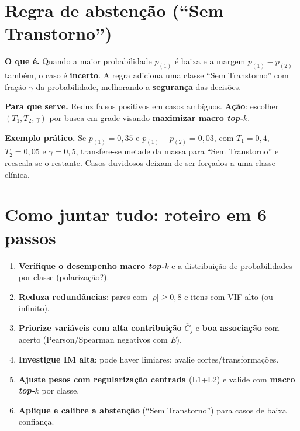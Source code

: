 \documentclass[12pt,a4paper]{article}
\begin{document}
\section{Regra de abstenção (``Sem Transtorno'')}
\textbf{O que é.} Quando a maior probabilidade $p_{(1)}$ é baixa e a margem $p_{(1)}-p_{(2)}$ também, o caso é \textbf{incerto}. A regra adiciona uma classe ``Sem Transtorno'' com fração $\gamma$ da probabilidade, melhorando a \textbf{segurança} das decisões.

\textbf{Para que serve.} Reduz falsos positivos em casos ambíguos. \textbf{Ação}: escolher $(T_1,T_2,\gamma)$ por busca em grade visando \textbf{maximizar macro \emph{top-$k$}}.

\textbf{Exemplo prático.} Se $p_{(1)}=0{,}35$ e $p_{(1)}-p_{(2)}=0{,}03$, com $T_1=0{,}4$, $T_2=0{,}05$ e $\gamma=0{,}5$, transfere-se metade da massa para ``Sem Transtorno'' e reescala-se o restante. Casos duvidosos deixam de ser forçados a uma classe clínica.

\section{Como juntar tudo: roteiro em 6 passos}
\begin{enumerate}[leftmargin=1.2cm]
  \item \textbf{Verifique o desempenho macro \emph{top-$k$}} e a distribuição de probabilidades por classe (polarização?).
  \item \textbf{Reduza redundâncias}: pares com $|\rho|\ge 0{,}8$ e itens com VIF alto (ou infinito).
  \item \textbf{Priorize variáveis com alta contribuição} $\overline{C}_j$ e \textbf{boa associação} com acerto (Pearson/Spearman negativos com $E$).
  \item \textbf{Investigue IM alta}: pode haver limiares; avalie cortes/transformações.
  \item \textbf{Ajuste pesos com regularização centrada} (L1+L2) e valide com \textbf{macro \emph{top-$k$}} por classe.
  \item \textbf{Aplique e calibre a abstenção} (``Sem Transtorno'') para casos de baixa confiança.
\end{enumerate}
\end{document}
